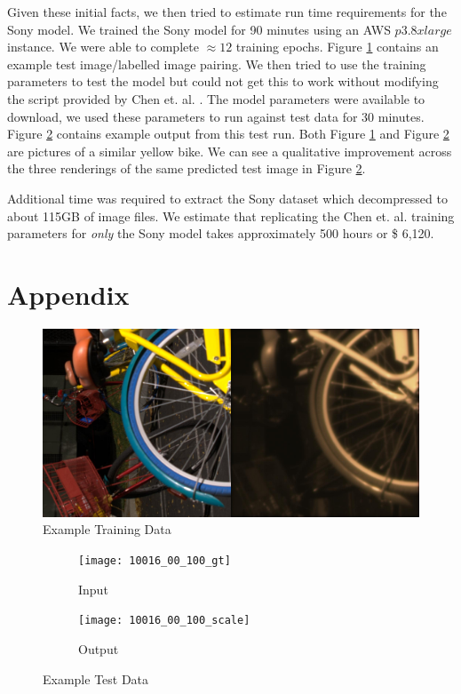 \documentclass{article}
\begin{document}
Given these initial facts, we then tried to estimate run time requirements
for the Sony model. We trained the Sony model for 90 minutes using an
AWS $p3.8xlarge$ instance. We were able to complete $\approx 12$ training
epochs. Figure \ref{fig:train} contains an example test image/labelled image
pairing. We then tried to use the training parameters to
test the model but could not get this to work without modifying the script
provided by Chen et. al. \cite{chen2018learning}. The model parameters
were available to download, we used these parameters to run against test
data for 30 minutes. Figure \ref{fig:test} contains example output from this
test run. Both Figure \ref{fig:train} and Figure \ref{fig:test}
are pictures of a similar yellow bike. We can see a qualitative improvement
across the three renderings of the same predicted test image in
Figure \ref{fig:test}.

Additional time was required to extract the Sony dataset
which decompressed to about 115GB of image files. We estimate that
replicating the Chen et. al. \cite{chen2018learning} training parameters
for \textit{only} the Sony model takes approximately 500 hours or
\$ 6,120.

\section{Appendix}

\begin{figure}[ht]
  \centering
  \includegraphics[scale=0.1]{00002_00_train_100}
  \caption{ Example Training Data}
  \label{fig:train}
\end{figure}

\begin{figure}[ht]
  \centering
  \begin{subfigure}[t]{0.3\textwidth}
    \texttt{[image: 10016\_00\_100\_gt]}
    \caption{Input}
  \end{subfigure}
  \begin{subfigure}[t]{0.3\textwidth}
    \texttt{[image: 10016\_00\_100\_scale]}
    \caption{Output}
  \end{subfigure}
  \caption{ Example Test Data}
  \label{fig:test}
\end{figure}




\end{document}
